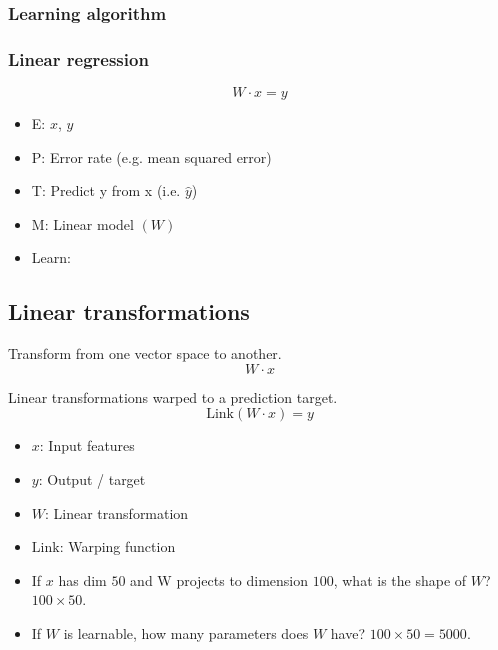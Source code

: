 \subsubsection{Learning algorithm}

\subsubsection{Linear regression}
\begin{example}
    \begin{equation}
        W \cdot x = y
    \end{equation}
    \begin{itemize}
        \item E: $x$, $y$
        \item P: Error rate (e.g. mean squared error)
        \item T: Predict y from x (i.e. $\hat y$)
        \item M: Linear model $(W)$
        \item Learn: 
    \end{itemize}
\end{example}

\subsection{Linear transformations}
\begin{definition}
    Transform from one vector space to another.
    \begin{equation*}
        W \cdot x
    \end{equation*}
\end{definition}

\begin{example} Linear transformations warped to a prediction target.
    \begin{equation*}
        \text{Link}(W \cdot x) = y
    \end{equation*}
    \begin{itemize}
        \item $x$: Input features
        \item $y$: Output / target 
        \item $W$: Linear transformation 
        \item $\text{Link}$: Warping function 
        \item If $x$ has dim $50$ and W projects to dimension $100$, what is the shape of $W$? $100 \times 50$.
        \item If $W$ is learnable, how many parameters does $W$ have? $100 \times 50 = 5000$.
    \end{itemize}
\end{example}

